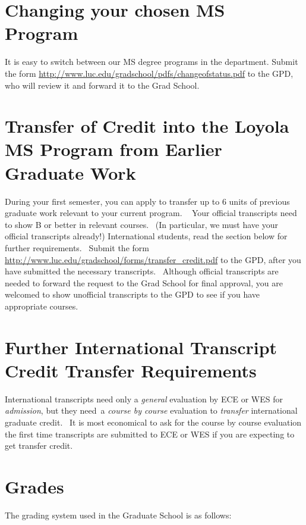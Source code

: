 \documentclass[letterpaper,10pt,english]{sphinxmanual}
\begin{document}
\section{Changing your chosen MS Program}
\label{regulations:changing-your-chosen-ms-program}
It is easy to switch between our MS degree programs in the department.
Submit the form
\href{http://www.luc.edu/gradschool/pdfs/changeofstatus.pdf}{http://www.luc.edu/gradschool/pdfs/changeofstatus.pdf}
to the GPD, who will review it and forward it to the Grad School.


\section{Transfer of Credit into the Loyola MS Program from Earlier Graduate Work}
\label{regulations:transfer-of-credit-into-the-loyola-ms-program-from-earlier-graduate-work}
During your first semester, you can apply to transfer up to 6 units of
previous graduate work relevant to your current program.   Your official
transcripts need to show B or better in relevant courses.  (In
particular, we must have your official transcripts already!)
International students, read the section below for further requirements.
 Submit the form
\href{http://www.luc.edu/gradschool/forms/transfer\_credit.pdf}{http://www.luc.edu/gradschool/forms/transfer\_credit.pdf}
to the GPD, after you have submitted the necessary transcripts.
 Although official transcripts are needed to forward the request to the
Grad School for final approval, you are welcomed to show unofficial
transcripts to the GPD to see if you have appropriate courses.


\section{Further International Transcript Credit Transfer Requirements}
\label{regulations:further-international-transcript-credit-transfer-requirements}
International transcripts need only a \emph{general} evaluation by ECE or
WES for \emph{admission}, but they need a \emph{course by course} evaluation to
\emph{transfer} international graduate credit.  It is most economical to ask
for the course by course evaluation the first time transcripts are
submitted to ECE or WES if you are expecting to get transfer credit.


\section{Grades}
\label{regulations:grades}
The grading system used in the Graduate School is as follows:
\end{document}
